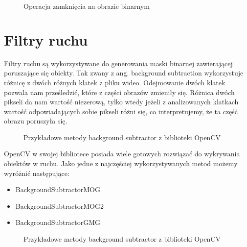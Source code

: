 \documentclass[a4paper,12pt,twoside,openany]{report}
\newcommand{\ImgPath}{.}
\begin{document}
\begin{figure}[H]
	\centering
	\caption{Operacja zamknięcia na obrazie binarnym}
\end{figure}

\section{Filtry ruchu}
Filtry ruchu są wykorzystywane do generowania maski binarnej zawierającej poruszające się obiekty. Tak zwany z ang. background subtraction wykorzystuje różnicę z dwóch różnych klatek z pliku wideo. Odejmowanie dwóch klatek pozwala nam prześledzić, które z części obrazów zmieniły się. Różnica dwóch pikseli da nam wartość niezerową, tylko wtedy jeżeli z analizowanych klatkach wartość odpowiadających sobie pikseli różni się, co interpretujemy, że ta część obrazu poruszyła się. 

\begin{figure}[H]
	\centering
	\caption{Przykładowe metody background subtractor z biblioteki OpenCV}
\end{figure}

OpenCV w swojej bibliotece posiada wiele gotowych rozwiązać do wykrywania obiektów w ruchu. Jako jedne z najczęściej wykorzystywanych metod możemy wyróżnić następujące:
\begin{itemize} 
	\item BackgroundSubtractorMOG
	\item BackgroundSubtractorMOG2
	\item BackgroundSubtractorGMG
\end{itemize} 
	
\begin{figure}[H]
	\centering
	\caption{Przykładowe metody background subtractor z biblioteki OpenCV}
\end{figure}
\end{document}
